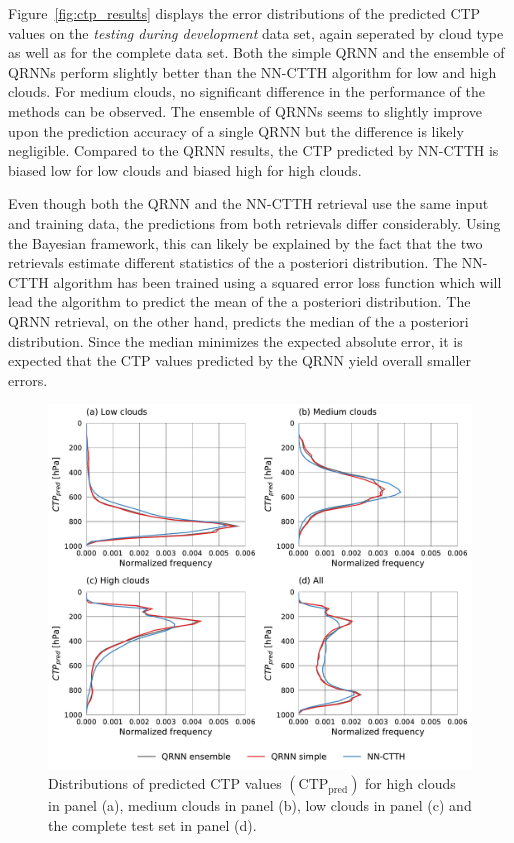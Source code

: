 \documentclass[journal abbreviation, manuscript]{copernicus}
\begin{document}
Figure~\ref{fig:ctp_results} displays the error distributions of the predicted
CTP values on the \textit{testing during development} data set, again seperated by
cloud type as well as for the complete data set. Both the simple QRNN and the ensemble
of QRNNs perform slightly better than the NN-CTTH algorithm for low and high clouds.
For medium clouds, no significant difference in the performance of the methods can
be observed. The ensemble of QRNNs seems to slightly improve upon the prediction
accuracy of a single QRNN but the difference is likely negligible. Compared to
the QRNN results, the CTP predicted by NN-CTTH is biased low for low clouds and
biased high for high clouds.

Even though both the QRNN and the NN-CTTH retrieval use the same input and
training data, the predictions from both retrievals differ considerably. Using
the Bayesian framework, this can likely be explained by the fact that the two
retrievals estimate different statistics of the a posteriori distribution. The
NN-CTTH algorithm has been trained using a squared error loss function which
will lead the algorithm to predict the mean of the a posteriori distribution.
The QRNN retrieval, on the other hand, predicts the median of the a posteriori
distribution. Since the median minimizes the expected absolute error, it is
expected that the CTP values predicted by the QRNN yield overall smaller errors.

\begin{figure}[htbp!]
  \centering
  \includegraphics[width = 0.8\linewidth]{../plots/fig09}
  \caption{Distributions of predicted CTP values $(\text{CTP}_{\text{pred}})$ 
    for high clouds in panel (a), medium clouds in panel (b), low
    clouds in panel (c) and the complete test set in panel (d).}
  \label{fig:ctp_results_p_dist}
\end{figure}
\end{document}
